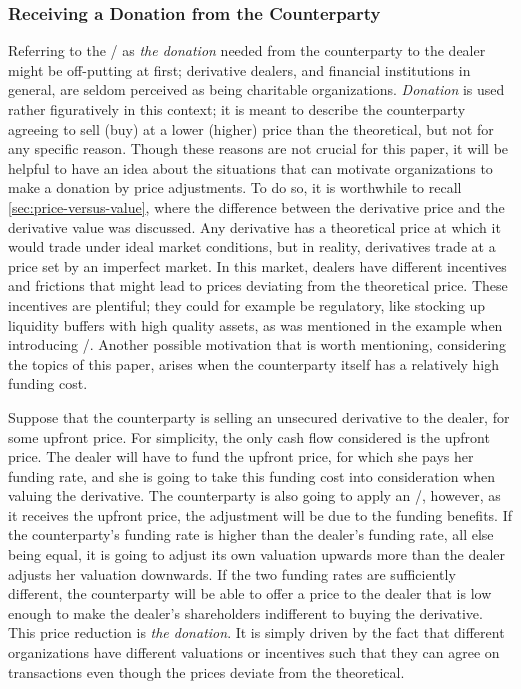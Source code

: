 \documentclass[main.tex]{subfiles}
\begin{document}
        \subsubsection*{Receiving a Donation from the Counterparty}

        Referring to the \FVA/ as \textit{the donation} needed from the counterparty to the dealer
        might be off-putting at first;
        derivative dealers, and financial institutions in general, 
        are seldom perceived as being charitable organizations.
        \textit{Donation} is used rather figuratively in this context;
        it is meant to describe the counterparty agreeing 
        to sell (buy) at a lower (higher) price than the theoretical,
        but not for any specific reason.
        Though these reasons are not crucial for this paper,
        it will be helpful to have an idea about the situations that can motivate organizations
        to make a donation by price adjustments.
        To do so, it is worthwhile to recall \cref{sec:price-versus-value},
        where the difference between the derivative price and the derivative value was discussed.
        Any derivative has a theoretical price 
        at which it would trade under ideal market conditions,
        but in reality, derivatives trade at a price set by an imperfect market.
        In this market, dealers have different incentives and frictions
        that might lead to prices deviating from the theoretical price.
        These incentives are plentiful; they could for example be regulatory, 
        like stocking up liquidity buffers with high quality assets,
        as was mentioned in the example when introducing \FVA/.
        Another possible motivation that is worth mentioning, considering the topics of this paper,
        arises when the counterparty itself has a relatively high funding cost.

        Suppose that the counterparty is selling an unsecured derivative to the dealer, 
        for some upfront price. 
        For simplicity, the only cash flow considered is the upfront price.
        The dealer will have to fund the upfront price, for which she pays her funding rate,
        and she is going to take this funding cost into consideration when valuing the derivative.
        The counterparty is also going to apply an \FVA/, however, as it receives the upfront price,
        the adjustment will be due to the funding benefits.
        If the counterparty's funding rate is higher than the dealer's funding rate,
        all else being equal, it is going to adjust its own valuation upwards more 
        than the dealer adjusts her valuation downwards. 
        If the two funding rates are sufficiently different, 
        the counterparty will be able to offer a price to the dealer
        that is low enough to make the dealer's shareholders indifferent to buying the derivative.
        This price reduction is \textit{the donation}.
        It is simply driven by the fact that different organizations 
        have different valuations or incentives such that they can agree on transactions
        even though the prices deviate from the theoretical.
\end{document}
